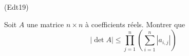 \begin{tiny}(Edt19)\end{tiny} Soit $A$ une matrice $n\times n$ à coefficients réels. Montrer que
\begin{displaymath}
 |\det A | \leq \prod_{j=1}^n\left(\sum_{i=1}^n|a_{i,j}| \right) 
\end{displaymath}
 